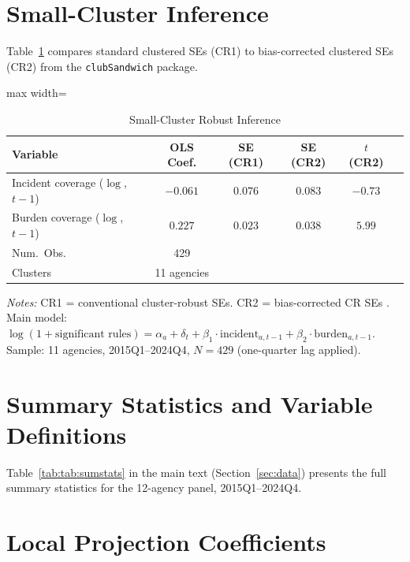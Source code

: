 \documentclass[12pt]{article}
\begin{document}
\section{Small-Cluster Inference}
\label{app:inference}

Table~\ref{tab:inference} compares standard clustered SEs (CR1) to bias-corrected clustered SEs (CR2) from the \texttt{clubSandwich} package.

\begin{table}[H]
\centering
\caption{Small-Cluster Robust Inference}
\label{tab:inference}
\begin{adjustbox}{max width=\textwidth}
\begin{threeparttable}
\begin{tabular}{lccccc}
\toprule
Variable & OLS Coef. & SE (CR1) & SE (CR2) & $t$ (CR2) \\
\midrule
Incident coverage ($\log$, $t-1$) & $-0.061$ & $0.076$ & $0.083$ & $-0.73$ \\
Burden coverage ($\log$, $t-1$) & $0.227$ & $0.023$ & $0.038$ & $5.99$ \\
\midrule
Num.\ Obs. & 429 & & & \\
Clusters & 11 agencies & & & \\
\bottomrule
\end{tabular}
\begin{tablenotes}
\small
\item \textit{Notes:} CR1 = conventional cluster-robust SEs. CR2 = bias-corrected CR SEs \citep{cameron1999bootstrap}. Main model: $\log(1+\text{significant rules}) = \alpha_a + \delta_t + \beta_1 \cdot \text{incident}_{a,t-1} + \beta_2 \cdot \text{burden}_{a,t-1}$. Sample: 11 agencies, 2015Q1--2024Q4, $N=429$ (one-quarter lag applied).
\end{tablenotes}
\end{threeparttable}
\end{adjustbox}
\end{table}

\section{Summary Statistics and Variable Definitions}
\label{app:sumstats}

Table~\ref{tab:tab:sumstats} in the main text (Section~\ref{sec:data}) presents the full summary statistics for the 12-agency panel, 2015Q1--2024Q4.

\section{Local Projection Coefficients}
\label{app:lp}
\end{document}
